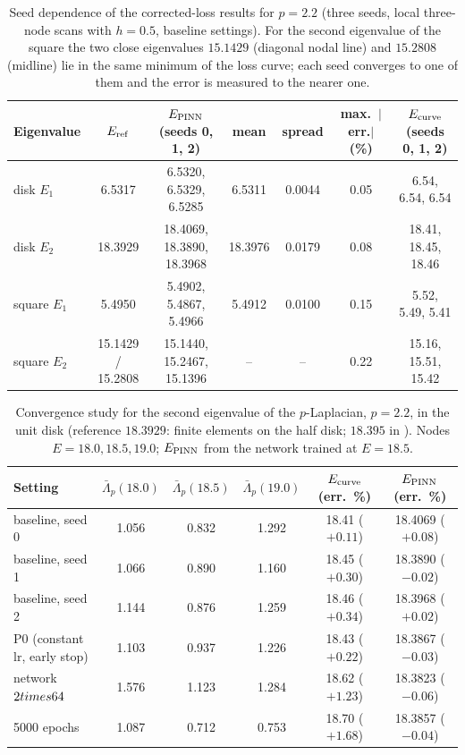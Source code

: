 \begin{table}[ht]
\centering
\begin{tabular}{lcccccc}
\toprule
Eigenvalue & $E_{\rm ref}$ & $E_{\rm PINN}$ (seeds 0, 1, 2) & mean & spread & max.\ $|$err.$|$ (\%) & $E_{\rm curve}$ (seeds 0, 1, 2) \\
\midrule
disk $E_1$ & 6.5317 & 6.5320, 6.5329, 6.5285 & 6.5311 & 0.0044 & 0.05 & 6.54, 6.54, 6.54 \\
disk $E_2$ & 18.3929 & 18.4069, 18.3890, 18.3968 & 18.3976 & 0.0179 & 0.08 & 18.41, 18.45, 18.46 \\
square $E_1$ & 5.4950 & 5.4902, 5.4867, 5.4966 & 5.4912 & 0.0100 & 0.15 & 5.52, 5.49, 5.41 \\
square $E_2$ & 15.1429 / 15.2808 & 15.1440, 15.2467, 15.1396 & -- & -- & 0.22 & 15.16, 15.51, 15.42 \\
\bottomrule
\end{tabular}
\caption{Seed dependence of the corrected-loss results for $p=2.2$ (three seeds, local three-node scans with $h=0.5$, baseline settings). For the second eigenvalue of the square the two close eigenvalues $15.1429$ (diagonal nodal line) and $15.2808$ (midline) lie in the same minimum of the loss curve; each seed converges to one of them and the error is measured to the nearer one.}
\label{tab.plap.seeds}
\end{table}

\begin{table}[ht]
\centering
\begin{tabular}{lccccc}
\toprule
Setting & $\bar\Lambda_p(18.0)$ & $\bar\Lambda_p(18.5)$ & $\bar\Lambda_p(19.0)$ & $E_{\rm curve}$ (err.\ \%) & $E_{\rm PINN}$ (err.\ \%) \\
\midrule
baseline, seed 0 & 1.056 & 0.832 & 1.292 & 18.41 ($+0.11$) & 18.4069 ($+0.08$) \\
baseline, seed 1 & 1.066 & 0.890 & 1.160 & 18.45 ($+0.30$) & 18.3890 ($-0.02$) \\
baseline, seed 2 & 1.144 & 0.876 & 1.259 & 18.46 ($+0.34$) & 18.3968 ($+0.02$) \\
P0 (constant lr, early stop) & 1.103 & 0.937 & 1.226 & 18.43 ($+0.22$) & 18.3867 ($-0.03$) \\
network $2\\times64$ & 1.576 & 1.123 & 1.284 & 18.62 ($+1.23$) & 18.3823 ($-0.06$) \\
5000 epochs & 1.087 & 0.712 & 0.753 & 18.70 ($+1.68$) & 18.3857 ($-0.04$) \\
\bottomrule
\end{tabular}
\caption{Convergence study for the second eigenvalue of the $p$-Laplacian, $p=2.2$, in the unit disk (reference $18.3929$: finite elements on the half disk; $18.395$ in \cite{HJ11}). Nodes $E=18.0,18.5,19.0$; $E_{\rm PINN}$ from the network trained at $E=18.5$.}
\label{tab.plap.conv2}
\end{table}

